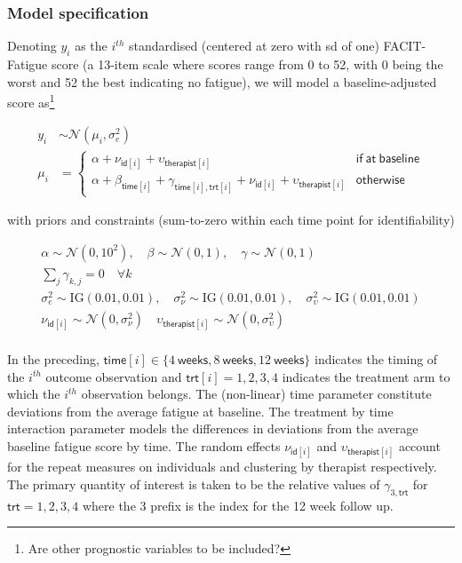 \documentclass[
]{article}
\begin{document}
\hypertarget{model-specification}{%
  \subsubsection{Model specification}\label{model-specification}}

Denoting $y_{i}$ as the $i^{th}$ standardised (centered at zero with sd of one) FACIT-Fatigue score (a 13-item scale where scores range from 0 to 52, with 0 being the worst and 52 the best indicating no fatigue), we will model a baseline-adjusted score as\footnote{Are other prognostic variables to be included?}

\[
  \begin{aligned}
    y_{i} & \sim \mathcal{N}(\mu_{i}, \sigma_e^2) \\
    \mu_i & = \begin{cases}
      \alpha + \nu_{\mathsf{id}[i]} + \upsilon_{\mathsf{therapist}[i]}                                                                        & \mathsf{if \ at \ baseline} \\
      \alpha + \beta_{\mathsf{time}[i]} + \gamma_{\mathsf{time}[i],\mathsf{trt}[i]} + \nu_{\mathsf{id}[i]} + \upsilon_{\mathsf{therapist}[i]} & \mathsf{otherwise}
    \end{cases}
  \end{aligned}
\]

with priors and constraints (sum-to-zero within each time point for identifiability)

\begin{gather*}
  \alpha \sim \mathcal{N}(0, 10^2), \quad \beta \sim \mathcal{N}(0, 1), \quad \gamma \sim \mathcal{N}(0, 1) \\
  \sum_j \gamma_{k,j} = 0 \quad \forall k  \\
  \sigma_e^2 \sim \text{IG}(0.01, 0.01), \quad \sigma_\nu^2 \sim \text{IG}(0.01, 0.01), \quad \sigma_\upsilon^2 \sim \text{IG}(0.01, 0.01) \\
  \nu_{\mathsf{id}[i]} \sim \mathcal{N}(0, \sigma_\nu^2) \quad \upsilon_{\mathsf{therapist}[i]} \sim \mathcal{N}(0, \sigma_\upsilon^2) \\
\end{gather*}


In the preceding, $\mathsf{time}[i] \in \{4 \mathsf{\ weeks}, 8 \mathsf{\ weeks}, 12 \mathsf{\ weeks}\}$ indicates the timing of the $i^{th}$ outcome observation and $\mathsf{trt}[i] = 1, 2, 3, 4$ indicates the treatment arm to which the $i^{th}$ observation belongs.
The (non-linear) time parameter constitute deviations from the average fatigue at baseline.
The treatment by time interaction parameter models the differences in deviations from the average baseline fatigue score by time.
The random effects $\nu_{\mathsf{id}[i]}$ and $\upsilon_{\mathsf{therapist}[i]}$ account for the repeat measures on individuals and clustering by therapist respectively.
The primary quantity of interest is taken to be the relative values of $\gamma_{3,\mathsf{trt}}$ for $\mathsf{trt} = 1, 2, 3, 4$ where the 3 prefix is the index for the 12 week follow up.
\end{document}
